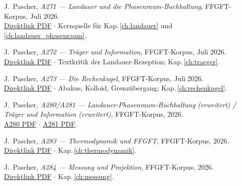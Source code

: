 \begin{description}[leftmargin=3.5em,style=sameline,itemsep=0.4em]

\item[{[P1]}] J.~Pascher, \textit{A271 — Landauer und die Phasenraum-Buchhaltung},
  FFGFT-Korpus, Juli 2026.\\
  \href{https://github.com/jpascher/T0-Time-Mass-Duality/blob/main/A_Serie_Export/pdf/A271_Landauer_De.pdf}{Direktlink PDF}
  $\cdot$ Kernquelle für Kap.\,\ref{ch:landauer} und \ref{ch:landauer_phasenraum}.

\item[{[P2]}] J.~Pascher, \textit{A272 — Träger und Information},
  FFGFT-Korpus, Juli 2026.\\
  \href{https://github.com/jpascher/T0-Time-Mass-Duality/blob/main/A_Serie_Export/pdf/A272_Traeger_und_Information_De.pdf}{Direktlink PDF}
  $\cdot$ Textkritik der Landauer-Rezeption; Kap.\,\ref{ch:traeger}.

\item[{[P3]}] J.~Pascher, \textit{A273 — Die Rechenkugel},
  FFGFT-Korpus, Juli 2026.\\
  \href{https://github.com/jpascher/T0-Time-Mass-Duality/blob/main/A_Serie_Export/pdf/A273_Die_Rechenkugel_De.pdf}{Direktlink PDF}
  $\cdot$ Abakus, Kolloid, Grenzübergang; Kap.\,\ref{ch:rechenkugel}.

\item[{[P4]}] J.~Pascher, \textit{A280/A281 — Landauer-Phasenraum-Buchhaltung
  (erweitert) / Träger und Information (erweitert)},
  FFGFT-Korpus, 2026.\\
  \href{https://github.com/jpascher/T0-Time-Mass-Duality/blob/main/A_Serie_Export/pdf/A280_Landauer_Phasenraum_Buchhaltung_De.pdf}{A280 PDF}
  $\cdot$
  \href{https://github.com/jpascher/T0-Time-Mass-Duality/blob/main/A_Serie_Export/pdf/A281_Traeger_und_Information_De.pdf}{A281 PDF}.

\item[{[P5]}] J.~Pascher, \textit{A283 — Thermodynamik und FFGFT},
  FFGFT-Korpus, 2026.\\
  \href{https://github.com/jpascher/T0-Time-Mass-Duality/blob/main/A_Serie_Export/pdf/A283_Thermodynamik_FFGFT_De.pdf}{Direktlink PDF}
  $\cdot$ Kap.\,\ref{ch:thermodynamik}.

\item[{[P6]}] J.~Pascher, \textit{A284 — Messung und Projektion},
  FFGFT-Korpus, 2026.\\
  \href{https://github.com/jpascher/T0-Time-Mass-Duality/blob/main/A_Serie_Export/pdf/A284_Messung_Projektion_De.pdf}{Direktlink PDF}
  $\cdot$ Kap.\,\ref{ch:messung}.


\end{description}
